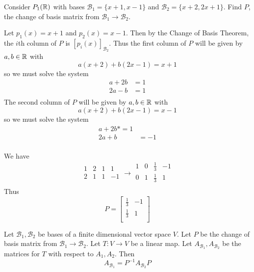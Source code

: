 \documentclass{article}
\begin{document}
\begin{example}
  Consider $P_1(\mathbb{R})$ with bases $\mathcal{B}_1 = \{x+1, x-1\}$ and $\mathcal{B}_2 = \{x+2, 2x + 1\}$. Find $P$, the change of basis matrix from $\mathcal{B}_1 \to \mathcal{B}_2$.

  Let $p_1(x) = x+1$ and $p_2(x) = x-1$. Then by the Change of Basis Theorem, the $i$th column of $P$ is $[p_i(x)]_{\mathcal{B}_2}$. Thus the first column of $P$ will be given by $a, b \in \mathbb{R}$ with \[
    a(x+2) + b(2x-1) = x+1
  \] so we must solve the system
  \begin{align*}
    a + 2b &= 1\\
    2a - b &= 1\\
  \end{align*}
  The second column of $P$ will be given by $a, b \in \mathbb{R}$ with \[
    a(x+2) + b(2x-1) = x - 1
  \] so we must solve the system
  \begin{align*}
    a + 2b *= 1\\
    2a + b &= -1\\
  \end{align*}

  We have \[
    \begin{array}{cc|cc}
      1 & 2 & 1 & 1\\
      2 & 1 & 1 & -1\\
    \end{array} \to
    \begin{array}{cc|cc}
      1 & 0 & \frac{1}{3} & -1\\
      0 & 1 & \frac{1}{3} & 1\\
    \end{array}
  \]Thus \[
    P =
    \begin{bmatrix}
      \frac{1}{3} & -1\\
      \frac{1}{3} & 1\\
    \end{bmatrix}
  \]
\end{example}
\begin{theorem}
  Let $\mathcal{B}_1, \mathcal{B}_2$ be bases of a finite dimensional vector space $V$. Let $P$ be the change of basis matrix from $\mathcal{B}_1 \to \mathcal{B}_2$. Let $T: V \to V$ be a linear map. Let $A_{\mathcal{B}_1}, A_{\mathcal{B}_2}$ be the matrices for $T$ with respect to $A_1, A_2$. Then \[
    A_{\mathcal{B}_1} = P^{-1}A_{\mathcal{B}_2}P
  \]
\end{theorem}
\end{document}

